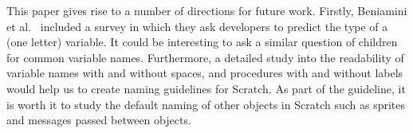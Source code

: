 \documentclass[conference]{IEEEtran}
\begin{document}
This paper gives rise to a number of directions for future work. Firstly, Beniamini et al.~\cite{Beniamini} included a survey in which they ask developers to predict the type of a (one letter) variable. It could be interesting to ask a similar question of children for common variable names. Furthermore, a detailed study into the readability of variable names with and without spaces, and procedures with and without labels would help us to create naming guidelines for Scratch. As part of the guideline, it is worth it to study the default naming of other objects in Scratch such as sprites and messages passed between objects. 






%

\end{document}
